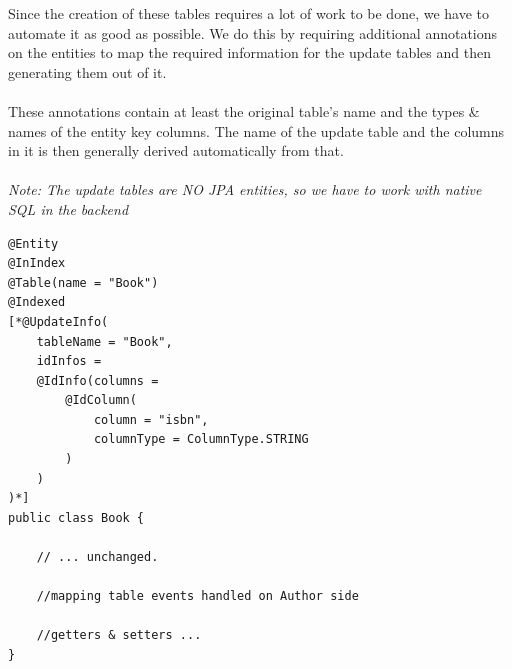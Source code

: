 Since the creation of these tables requires a lot of work to be done, we have to automate it as good as possible. We do this by requiring additional annotations on the entities to map the required information for the update tables and then generating them out of it.
\\\\
These annotations contain at least the original table's name and the types \& names of the entity key columns. The name of the update table and the columns in it is then generally derived automatically from that.
\\\\
\textit{Note: The update tables are NO JPA entities, so we have to work with native SQL in the backend}
\\
\lstset{language=java}
\begin{lstlisting}[frame=htrbl, caption={Book.java with Hibernate Search annotations}, label={lst:book.java_3}]
@Entity
@InIndex
@Table(name = "Book")
@Indexed
[*@UpdateInfo(
	tableName = "Book", 
	idInfos = 
	@IdInfo(columns = 
		@IdColumn(
			column = "isbn", 
			columnType = ColumnType.STRING
		)
	)
)*]
public class Book {

	// ... unchanged. 
	
	//mapping table events handled on Author side
	
	//getters & setters ...
}
\end{lstlisting}

